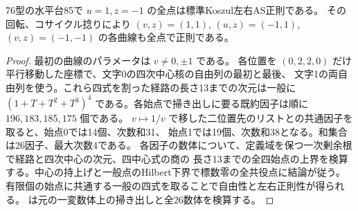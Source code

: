 \begin{proposition}
76型の水平台85で $u=1,z=-1$ の全点は標準Koszul左右AS正則である。
その回転、コサイクル捻りにより $(v,z)=(1,1)$, $(u,z)=(-1,1)$, $(v,z)=(-1,-1)$ の各曲線も全点で正則である。
\end{proposition}
\begin{proof}
最初の曲線のパラメータは $v\ne0,\pm1$ である。
各位置を $(0,2,2,0)$ だけ平行移動した座標で、文字0の四次中心核の自由列の最初と最後、
文字1の両自由列を使う。これら四式を割った経路の長さ13までの次元は一般に
$(1+T+T^2+T^3)^4$ である。各始点で掃き出しに要る既約因子は順に $196,183,185,175$ 個である。
$v\mapsto1/v$ で移した二位置先のリストとの共通因子を取ると、始点0では14個、次数和31、
始点1では19個、次数和38となる。和集合は26因子、最大次数4である。
各因子の数体について、定義域を保つ一次剰余根で経路と四次中心の次元、四中心式の商の
長さ13までの全四始点の上界を検算する。中心の持上げと一般点のHilbert下界で標数零の全共役点に結論が従う。
有限個の始点に共通する一般の四式を取ることで自由性と左右正則性が得られる。
 は元の一変数体上の掃き出しと全26数体を検算する。
\end{proof}
